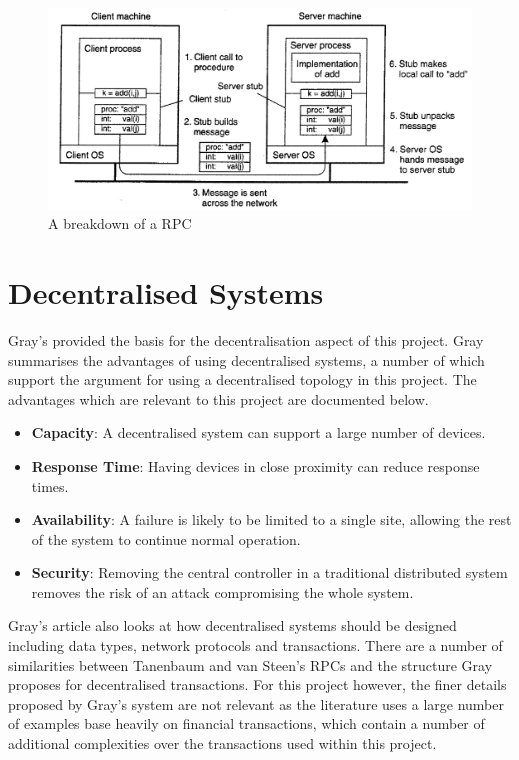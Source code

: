 \documentclass[a4paper, 11pt]{report}
\begin{document}
\begin{figure}[H]
\centering
\includegraphics[width=\textwidth,keepaspectratio]{rpc}
\caption{A breakdown of a \acrshort{RPC} \cite{tanenbaumdist}} 
\label{fig:rpc}
\end{figure}

\section{Decentralised Systems} \label{decentrailsed}
Gray's  \cite{decentralised} provided the basis for the decentralisation aspect of this project. Gray summarises the advantages of using decentralised systems, a number of which support the argument for using a decentralised topology in this project. The advantages which are relevant to this project are documented below.

\begin{itemize}
    \item \textbf{Capacity}: A decentralised system can support a large number of devices.
    \item \textbf{Response Time}: Having devices in close proximity can reduce response times.
    \item \textbf{Availability}: A failure is likely to be limited to a single site, allowing the rest of the system to continue normal operation.
    \item \textbf{Security}: Removing the central controller in a traditional distributed system removes the risk of an attack compromising the whole system.
\end{itemize}

Gray's article also looks at how decentralised systems should be designed including data types, network protocols and transactions. There are a number of similarities between Tanenbaum and van Steen's \acrshort{RPC}s and the structure Gray proposes for decentralised transactions. For this project however, the finer details proposed by Gray's system are not relevant as the literature uses a large number of examples base heavily on financial transactions, which contain a number of additional complexities over the transactions used within this project.
\end{document}
